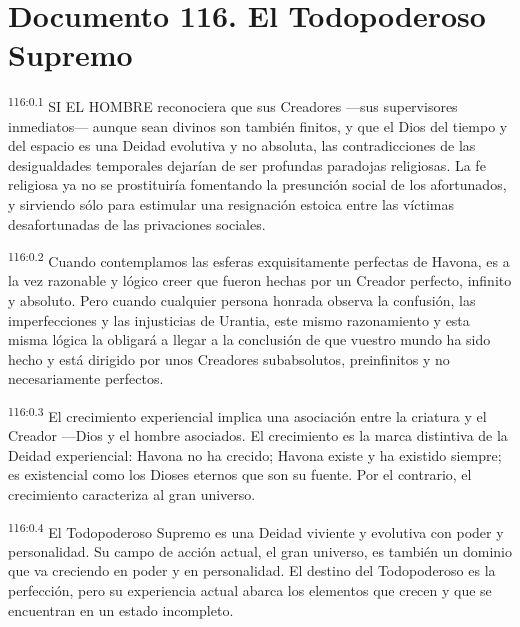 \chapter{Documento 116. El Todopoderoso Supremo}
\par
\textsuperscript{116:0.1} SI EL HOMBRE reconociera que sus Creadores ---sus supervisores inmediatos--- aunque sean divinos son también finitos, y que el Dios del tiempo y del espacio es una Deidad evolutiva y no absoluta, las contradicciones de las desigualdades temporales dejarían de ser profundas paradojas religiosas. La fe religiosa ya no se prostituiría fomentando la presunción social de los afortunados, y sirviendo sólo para estimular una resignación estoica entre las víctimas desafortunadas de las privaciones sociales.

\par
\textsuperscript{116:0.2} Cuando contemplamos las esferas exquisitamente perfectas de Havona, es a la vez razonable y lógico creer que fueron hechas por un Creador perfecto, infinito y absoluto. Pero cuando cualquier persona honrada observa la confusión, las imperfecciones y las injusticias de Urantia, este mismo razonamiento y esta misma lógica la obligará a llegar a la conclusión de que vuestro mundo ha sido hecho y está dirigido por unos Creadores subabsolutos, preinfinitos y no necesariamente perfectos.

\par
\textsuperscript{116:0.3} El crecimiento experiencial implica una asociación entre la criatura y el Creador ---Dios y el hombre asociados. El crecimiento es la marca distintiva de la Deidad experiencial: Havona no ha crecido; Havona existe y ha existido siempre; es existencial como los Dioses eternos que son su fuente. Por el contrario, el crecimiento caracteriza al gran universo.

\par
\textsuperscript{116:0.4} El Todopoderoso Supremo es una Deidad viviente y evolutiva con poder y personalidad. Su campo de acción actual, el gran universo, es también un dominio que va creciendo en poder y en personalidad. El destino del Todopoderoso es la perfección, pero su experiencia actual abarca los elementos que crecen y que se encuentran en un estado incompleto.

